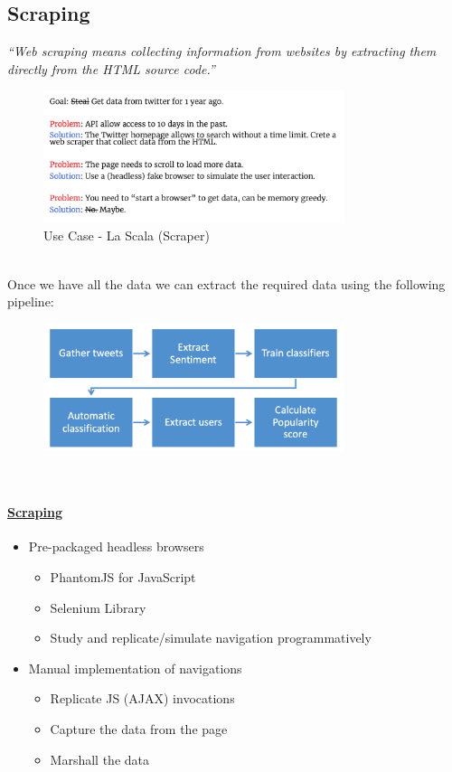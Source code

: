 \documentclass[10pt,a4paper]{article}
\begin{document}
 \subsection{Scraping}
 \textit{
“Web scraping means collecting information from websites by extracting them directly from the HTML source code.”}
  \begin{figure}[ht!]
 \hfill \includegraphics[width=250pt]{images/web-scraper-lascala}
 \hspace*{\fill}
 \caption{Use Case - La Scala (Scraper)}
 \end{figure} \\
 Once we have all the data we can extract the required data using the following pipeline:
   \begin{figure}[ht!]
 \hfill \includegraphics[width=250pt]{images/web-scraper-lascala2}
 \hspace*{\fill}
 \end{figure}  \\
 \paragraph{\uline{Scraping}}
 \begin{itemize}
 \item Pre-packaged headless browsers
 \begin{itemize}
 	\item PhantomJS for JavaScript
 	\item Selenium Library
 	\item Study and replicate/simulate navigation programmatively
 \end{itemize}
 \item  Manual implementation of navigations
 \begin{itemize}
 	\item Replicate JS (AJAX) invocations
 	\item Capture the data from the page
 	\item Marshall the data
 \end{itemize}
 \end{itemize}
 
\end{document}
